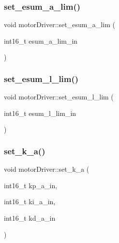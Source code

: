 \mbox{\label{classmotorDriver_af6a5a35004ac1a9b7b3c928e75b04c99}} 
\subsubsection{\texorpdfstring{set\_esum\_a\_lim()}{set\_esum\_a\_lim()}}
{\footnotesize\ttfamily void motor\+Driver\+::set\+\_\+esum\+\_\+a\+\_\+lim (\begin{DoxyParamCaption}\item[{int16\+\_\+t}]{esum\+\_\+a\+\_\+lim\+\_\+in }\end{DoxyParamCaption})}

\mbox{\label{classmotorDriver_acc7dca0d73b3603ba74b74852bf14d18}} 
\subsubsection{\texorpdfstring{set\_esum\_l\_lim()}{set\_esum\_l\_lim()}}
{\footnotesize\ttfamily void motor\+Driver\+::set\+\_\+esum\+\_\+l\+\_\+lim (\begin{DoxyParamCaption}\item[{int16\+\_\+t}]{esum\+\_\+l\+\_\+lim\+\_\+in }\end{DoxyParamCaption})}

\mbox{\label{classmotorDriver_a6c33038958e390dcf98d2f72b6341491}} 
\subsubsection{\texorpdfstring{set\_k\_a()}{set\_k\_a()}}
{\footnotesize\ttfamily void motor\+Driver\+::set\+\_\+k\+\_\+a (\begin{DoxyParamCaption}\item[{int16\+\_\+t}]{kp\+\_\+a\+\_\+in,  }\item[{int16\+\_\+t}]{ki\+\_\+a\+\_\+in,  }\item[{int16\+\_\+t}]{kd\+\_\+a\+\_\+in }\end{DoxyParamCaption})}

